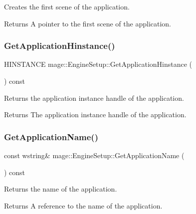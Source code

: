 Creates the first scene of the application.

\begin{DoxyReturn}{Returns}
A pointer to the first scene of the application. 
\end{DoxyReturn}
\hypertarget{structmage_1_1_engine_setup_a2d9220896adfe924ac72165b4e2b13cf}{}\label{structmage_1_1_engine_setup_a2d9220896adfe924ac72165b4e2b13cf} 
\subsubsection{\texorpdfstring{Get\+Application\+Hinstance()}{GetApplicationHinstance()}}
{\footnotesize\ttfamily H\+I\+N\+S\+T\+A\+N\+CE mage\+::\+Engine\+Setup\+::\+Get\+Application\+Hinstance (\begin{DoxyParamCaption}{ }\end{DoxyParamCaption}) const}

Returns the application instance handle of the application.

\begin{DoxyReturn}{Returns}
The application instance handle of the application. 
\end{DoxyReturn}
\hypertarget{structmage_1_1_engine_setup_a63fed5e978c020ebc9d5080fe6fcefdc}{}\label{structmage_1_1_engine_setup_a63fed5e978c020ebc9d5080fe6fcefdc} 
\subsubsection{\texorpdfstring{Get\+Application\+Name()}{GetApplicationName()}}
{\footnotesize\ttfamily const wstring\& mage\+::\+Engine\+Setup\+::\+Get\+Application\+Name (\begin{DoxyParamCaption}{ }\end{DoxyParamCaption}) const}

Returns the name of the application.

\begin{DoxyReturn}{Returns}
A reference to the name of the application. 
\end{DoxyReturn}
\hypertarget{structmage_1_1_engine_setup_ad7066882519b59ca533293f743334508}{}\label{structmage_1_1_engine_setup_ad7066882519b59ca533293f743334508} 
